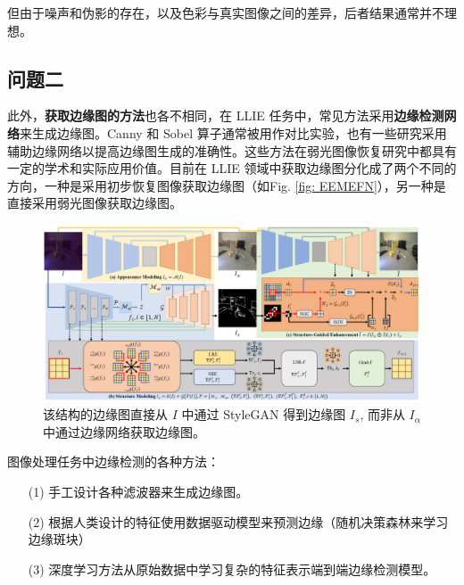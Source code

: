 \documentclass[a4paper, 10pt]{article}
\begin{document}
		但由于噪声和伪影的存在，以及色彩与真实图像之间的差异，后者结果通常并不理想。

		\subsection{问题二} 
		
		此外，\textbf{获取边缘图的方法}也各不相同，在 LLIE 任务中，常见方法采用\textbf{边缘检测网络}来生成边缘图。Canny 和 Sobel 算子通常被用作对比实验，也有一些研究采用辅助边缘网络以提高边缘图生成的准确性。这些方法在弱光图像恢复研究中都具有一定的学术和实际应用价值。目前在 LLIE 领域中获取边缘图分化成了两个不同的方向，一种是采用初步恢复图像获取边缘图（如Fig. \ref{fig: EEMEFN}），另一种是直接采用弱光图像获取边缘图。
		
		\begin{figure}[htbp]
			\centering 
			\includegraphics[width=\columnwidth]{picture/LLIE/Structure Modeling and Guidance/Overview}
			\caption{
				\label{fig: Overview} 
				该结构的边缘图直接从 $I$ 中通过 StyleGAN 得到边缘图 $I_s$, 而非从 $I_{\alpha}$ 中通过边缘网络获取边缘图。
			}
		\end{figure}
		
		图像处理任务中边缘检测的各种方法：
		
		\begin{itemize}
			\item[(1)] 
			手工设计各种滤波器来生成边缘图。
			
			\item[(2)]
			根据人类设计的特征使用数据驱动模型来预测边缘（随机决策森林来学习边缘斑块）
			
			\item[(3)]
			深度学习方法从原始数据中学习复杂的特征表示端到端边缘检测模型。
		\end{itemize}	
		
\end{document}
